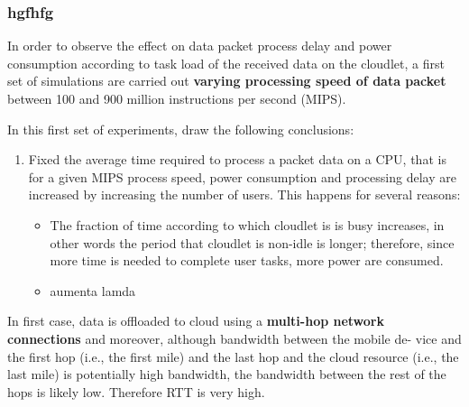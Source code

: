 \documentclass[sigchi]{acmart}
\begin{document}
\subsubsection{hgfhfg}

In order to observe the effect on data packet process delay and power consumption according to task load of the received data on the cloudlet, a first set of simulations are carried out \textbf{varying processing speed of data packet} between 100 and 900 million instructions per second (MIPS). 

In this first set of experiments, \citet{MSAReport} draw the following conclusions:

\begin{enumerate}

\item Fixed the average time required to process a packet data on a CPU, that is for a given MIPS process speed, power consumption and processing delay are increased by increasing the number of users. This happens for several reasons:

\begin{itemize}
\item The fraction of time according to which cloudlet is is busy increases, in other words the period that cloudlet is non-idle is longer; therefore, since more time is needed to complete user tasks, more power are consumed.

\item aumenta lamda
\end{itemize} 





\end{enumerate}












In first case, data is offloaded to cloud using a \textbf{multi-hop network connections} and moreover, although bandwidth between the mobile de-
vice and the first hop (i.e., the first mile) and the last hop and the cloud resource (i.e., the last mile) is potentially high bandwidth, the bandwidth between the rest of the hops is likely low. Therefore RTT is very high.
\end{document}
